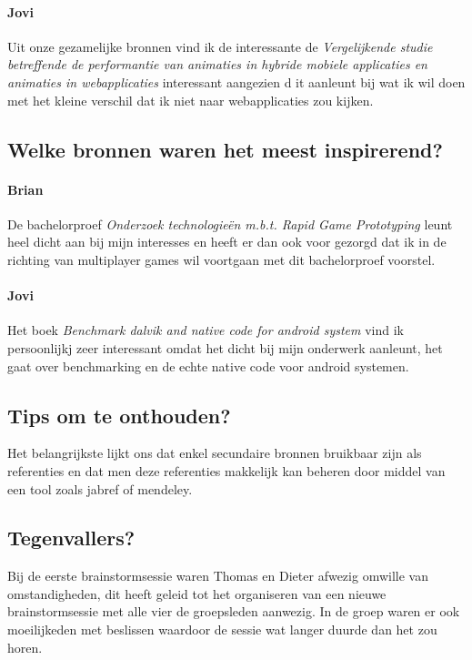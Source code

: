 \documentclass[fleqn,10pt]{voorstel}
\begin{document}
\paragraph{Jovi}Uit onze gezamelijke bronnen vind ik de interessante de \textit{Vergelijkende studie betreffende de performantie van animaties in hybride mobiele applicaties en animaties in webapplicaties} \citep{Devos2015} interessant aangezien d it aanleunt bij wat ik wil doen met het kleine verschil dat ik niet naar webapplicaties zou kijken.

\subsection{Welke bronnen waren het meest inspirerend?}



\paragraph{Brian}De bachelorproef \textit{Onderzoek technologieën m.b.t. Rapid Game Prototyping} \citep{Timmerman2013} leunt heel dicht aan bij mijn interesses en heeft er dan ook voor gezorgd dat ik in de richting van multiplayer games wil voortgaan met dit bachelorproef voorstel.

\paragraph{Jovi} Het boek \textit{Benchmark dalvik and native code for android system} \citep{Lin2011} vind ik persoonlijkj zeer interessant omdat het dicht bij mijn onderwerk aanleunt, het gaat over benchmarking en de echte native code voor android systemen.

\subsection{Tips om te onthouden?}
Het belangrijkste lijkt ons dat enkel secundaire bronnen bruikbaar zijn als referenties en dat men deze referenties makkelijk kan beheren door middel van een tool zoals jabref of mendeley.

\subsection{Tegenvallers?}
Bij de eerste brainstormsessie waren Thomas en Dieter afwezig omwille van omstandigheden, dit heeft geleid tot het organiseren van een nieuwe brainstormsessie met alle vier de groepsleden aanwezig. In de groep waren er ook
moeilijkeden met beslissen waardoor de sessie wat langer duurde dan het zou horen.
\end{document}
